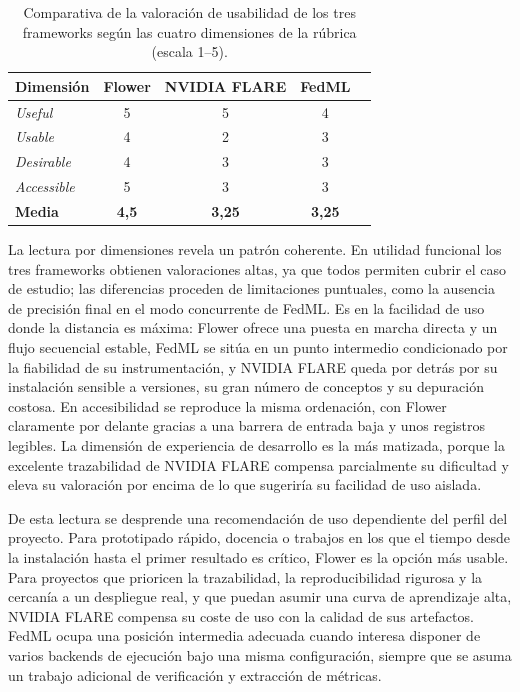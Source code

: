 \begin{table}[htbp]
  \centering
  \caption{Comparativa de la valoración de usabilidad de los tres frameworks según las
  cuatro dimensiones de la rúbrica (escala 1--5).}
  \label{tab:usab-comparativa}
  \begin{tabular}{lcccc}
    \toprule
    \textbf{Dimensión} & \textbf{Flower} & \textbf{NVIDIA FLARE} & \textbf{FedML} \\
    \midrule
    \textit{Useful}     & 5 & 5 & 4 \\
    \textit{Usable}     & 4 & 2 & 3 \\
    \textit{Desirable}  & 4 & 3 & 3 \\
    \textit{Accessible} & 5 & 3 & 3 \\
    \midrule
    \textbf{Media}      & \textbf{4{,}5} & \textbf{3{,}25} & \textbf{3{,}25} \\
    \bottomrule
  \end{tabular}
\end{table}

La lectura por dimensiones revela un patrón coherente. En utilidad funcional los tres
frameworks obtienen valoraciones altas, ya que todos permiten cubrir el caso de estudio; las
diferencias proceden de limitaciones puntuales, como la ausencia de precisión final en el
modo concurrente de FedML. Es en la facilidad de uso donde la distancia es máxima: Flower
ofrece una puesta en marcha directa y un flujo secuencial estable, FedML se sitúa en un punto
intermedio condicionado por la fiabilidad de su instrumentación, y NVIDIA FLARE queda por
detrás por su instalación sensible a versiones, su gran número de conceptos y su depuración
costosa. En accesibilidad se reproduce la misma ordenación, con Flower claramente por delante
gracias a una barrera de entrada baja y unos registros legibles. La dimensión de experiencia
de desarrollo es la más matizada, porque la excelente trazabilidad de NVIDIA FLARE compensa
parcialmente su dificultad y eleva su valoración por encima de lo que sugeriría su facilidad
de uso aislada.

De esta lectura se desprende una recomendación de uso dependiente del perfil del proyecto.
Para prototipado rápido, docencia o trabajos en los que el tiempo desde la instalación hasta
el primer resultado es crítico, Flower es la opción más usable. Para proyectos que prioricen
la trazabilidad, la reproducibilidad rigurosa y la cercanía a un despliegue real, y que puedan
asumir una curva de aprendizaje alta, NVIDIA FLARE compensa su coste de uso con la calidad de
sus artefactos. FedML ocupa una posición intermedia adecuada cuando interesa disponer de
varios backends de ejecución bajo una misma configuración, siempre que se asuma un trabajo
adicional de verificación y extracción de métricas.

